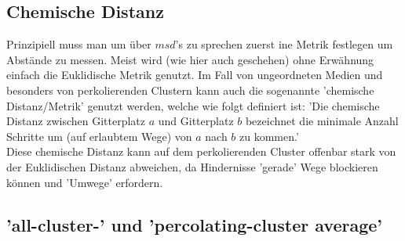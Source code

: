 \documentclass[a4paper, 12pt]{report}
\begin{document}
\subsection{Chemische Distanz}
Prinzipiell muss man um über $msd$'s zu sprechen zuerst ine Metrik festlegen um Abstände zu messen. Meist wird (wie hier auch geschehen) ohne Erwähnung einfach die Euklidische Metrik genutzt. Im Fall von ungeordneten Medien und besonders von perkolierenden Clustern kann auch die sogenannte 'chemische Distanz/Metrik' genutzt werden, welche wie folgt definiert ist:
'Die chemische Distanz zwischen Gitterplatz $a$ und Gitterplatz $b$ bezeichnet die minimale Anzahl Schritte um (auf erlaubtem Wege) von $a$ nach $b$ zu kommen.' 
\\
\noindent Diese chemische Distanz kann auf dem perkolierenden Cluster offenbar stark von der Euklidischen Distanz abweichen, da Hindernisse 'gerade' Wege blockieren können und 'Umwege' erfordern.
 

\subsection{'all-cluster-' und 'percolating-cluster average'}
\end{document}
